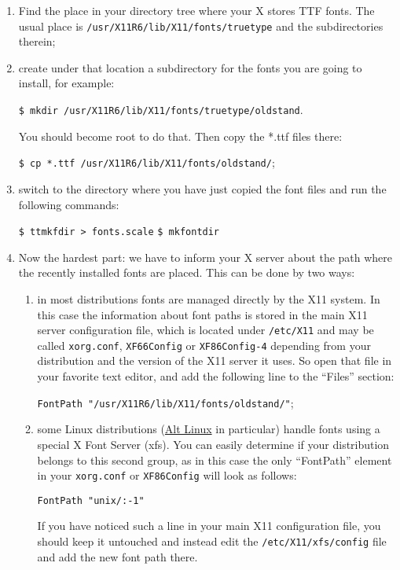 \documentclass[12pt,a4paper,openany]{book}
\begin{document}
\begin{enumerate}

\item Find the place in your directory tree where your X stores TTF fonts.
The usual place is \texttt{/usr/X11R6/lib/X11/fonts/truetype} and the
subdirectories therein;

\item create under that location a subdirectory for the fonts you are going
to install, for example:

\texttt{\$ mkdir /usr/X11R6/lib/X11/fonts/truetype/oldstand}.

You should become root to do that. Then copy the *.ttf files there:

\texttt{\$ cp *.ttf /usr/X11R6/lib/X11/fonts/oldstand/};

\item switch to the directory where you have just copied the font files and
run the following commands:

\texttt{\$ ttmkfdir > fonts.scale}
\texttt{\$ mkfontdir}

\item Now the hardest part: we have to inform your X server about the path
where the recently installed fonts are placed. This can be done by
two ways:

\begin{enumerate}

\item in most distributions fonts are managed directly by the X11 system.
In this case the information about font paths is stored in the main X11
server configuration file, which is located under \texttt{/etc/X11} and
may be called \texttt{xorg.conf}, \texttt{XF66Config} or
\texttt{XF86Config-4} depending from your distribution and the version of
the X11 server it uses. So open that file in your favorite text editor,
and add the following line to the “Files” section:

\texttt{FontPath "/usr/X11R6/lib/X11/fonts/oldstand/"};

\item some Linux distributions (\href{http://www.altlinux.ru}{Alt Linux} in
particular) handle fonts using a special X Font Server (xfs). You can
easily determine if your distribution belongs to this second group, as in
this case the only “FontPath” element in your \texttt{xorg.conf} or
\texttt{XF86Config} will look as follows:

\texttt{FontPath "unix/:-1"}

If you have noticed such a line in your main X11 configuration file, you
should keep it untouched and instead edit the \texttt{/etc/X11/xfs/config}
file and add the new font path there.


\end{enumerate}
\end{enumerate}
\end{document}
